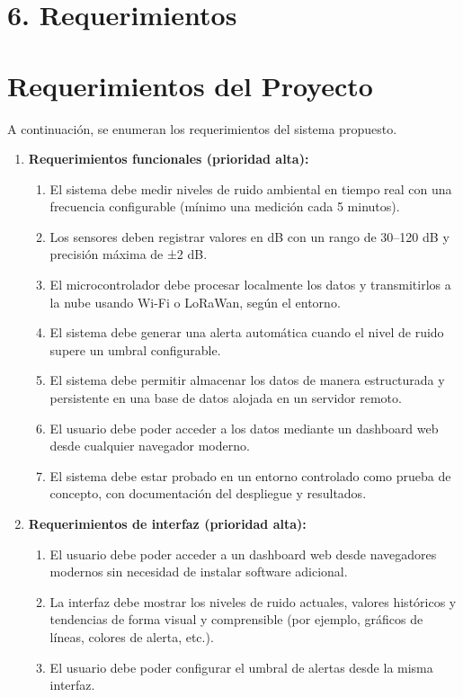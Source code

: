 \documentclass[
11pt, %
]{charter}
\begin{document}
\section{6. Requerimientos}
\label{sec:requerimientos}

\section{Requerimientos del Proyecto}

A continuación, se enumeran los requerimientos del sistema propuesto.

\begin{enumerate}
    \item \textbf{Requerimientos funcionales (prioridad alta):}
    \begin{enumerate}
        \item El sistema debe medir niveles de ruido ambiental en tiempo real con una frecuencia configurable (mínimo una medición cada 5 minutos).
        \item Los sensores deben registrar valores en dB con un rango de 30–120 dB y precisión máxima de ±2 dB.
        \item El microcontrolador debe procesar localmente los datos y transmitirlos a la nube usando Wi-Fi o LoRaWan, según el entorno.
        \item El sistema debe generar una alerta automática cuando el nivel de ruido supere un umbral configurable.
        \item El sistema debe permitir almacenar los datos de manera estructurada y persistente en una base de datos alojada en un servidor remoto.
        \item El usuario debe poder acceder a los datos mediante un dashboard web desde cualquier navegador moderno.
        \item El sistema debe estar probado en un entorno controlado como prueba de concepto, con documentación del despliegue y resultados.
    \end{enumerate}

    \item \textbf{Requerimientos de interfaz (prioridad alta):}
    \begin{enumerate}
        \item El usuario debe poder acceder a un dashboard web desde navegadores modernos sin necesidad de instalar software adicional.
        \item La interfaz debe mostrar los niveles de ruido actuales, valores históricos y tendencias de forma visual y comprensible (por ejemplo, gráficos de líneas, colores de alerta, etc.).
        \item El usuario debe poder configurar el umbral de alertas desde la misma interfaz.
    \end{enumerate}


\end{enumerate}
\end{document}
